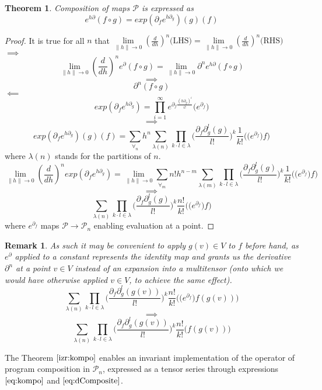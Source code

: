 \documentclass{article}
\newcommand{\dP}{\mathcal{P}}
\newcommand{\D}{\partial}
\newtheorem{izrek}{Theorem}[section]
\newtheorem{opomba}{Remark}[section]
\begin{document}
 \begin{izrek}\label{izr:kompo}
 Composition of maps $\dP$ is expressed as
 \begin{equation}\label{eq:kompo}
 e^{h\D}(f\circ g)=exp(\D_fe^{h\D_g})(g)(f)
 \end{equation}
 \end{izrek}
 
\begin{proof}
 It is true for all $n$ that $\lim\limits_{\lVert h\rVert\to 0}(\frac{d}{dh})^n\text{(LHS)}=\lim\limits_{\lVert h\rVert\to 0}(\frac{d}{dh})^n\text{(RHS)}$\\
 $\implies$
 $$\lim\limits_{\lVert h\rVert\to 0}(\frac{d}{dh})^ne^\D(f\circ g)=\lim\limits_{\lVert h\rVert\to 0}\D^ne^{h\D}(f\circ g)$$
 $$\implies$$
 $$\D^n(f\circ g)$$
 $\impliedby$
 $$exp(\D_fe^{h\D_g})=\prod_{i=1}^{\infty}e^{\D_f\frac{(h\D_g)^i}{i!}}\Big(e^{\D_f}\Big)$$
 $$\implies$$
 $$exp(\D_fe^{h\D_g})(g)(f)=\sum\limits_{\forall_n}h^n\sum\limits_{\lambda(n)}\prod\limits_{k\cdot l\in\lambda}\Big(\frac{\D_f\D_g^l(g)}{l!}\Big)^k\frac{1}{k!}\Big(\Big(e^{\D_f}\Big)f\Big)$$
 where $\lambda(n)$ stands for the partitions of $n$.
 $$\lim\limits_{\lVert h\rVert\to 0}(\frac{d}{dh})^nexp(\D_fe^{h\D_g})=\lim\limits_{\lVert h\rVert\to 0}\sum\limits_{\forall_m}n!h^{n-m}\sum\limits_{\lambda(m)}\prod\limits_{k\cdot l\in\lambda}\Big(\frac{\D_f\D_g^l(g)}{l!}\Big)^k\frac{1}{k!}\Big(\Big(e^{\D_f}\Big)f\Big)$$
 $$\implies$$
 \begin{equation}\label{eq:dComposite}
 \sum\limits_{\lambda(n)}\prod\limits_{k\cdot l\in\lambda}\Big(\frac{\D_f\D_g^l(g)}{l!}\Big)^k\frac{n!}{k!}\Big(\Big(e^{\D_f}\Big)f\Big)
 \end{equation}
 where $e^{\D_f}$ maps $\dP\to\dP_n$ enabling evaluation at a point. 
 \end{proof}       
 \begin{opomba}
 As such it may be convenient to apply $g(v)\in V$ to $f$ before hand, as $e^\D$ applied to a constant represents the identity map and grants us the derivative $\D^n$ at a point $v\in V$ instead of an expansion into a multitensor (onto which we would have otherwise applied $v\in V$, to achieve the same effect).
  $$\sum\limits_{\lambda(n)}\prod\limits_{k\cdot l\in\lambda}\Big(\frac{\D_f\D_g^l(g(v))}{l!}\Big)^k\frac{n!}{k!}\Big(\Big(e^{\D_f}\Big)f(g(v))\Big)$$
  $$\implies$$
  \begin{equation}\label{eq:dCompositePoint}
  \sum\limits_{\lambda(n)}\prod\limits_{k\cdot l\in\lambda}\Big(\frac{\D_f\D_g^l(g(v))}{l!}\Big)^k\frac{n!}{k!}\Big(f(g(v))\Big)
  \end{equation}
 \end{opomba}
 The Theorem $\ref{izr:kompo}$ enables an invariant implementation of the operator of program composition in $\dP_n$, expressed as a tensor series through expressions $\eqref{eq:kompo}$ and $\eqref{eq:dComposite}$. 
 
\end{document}
